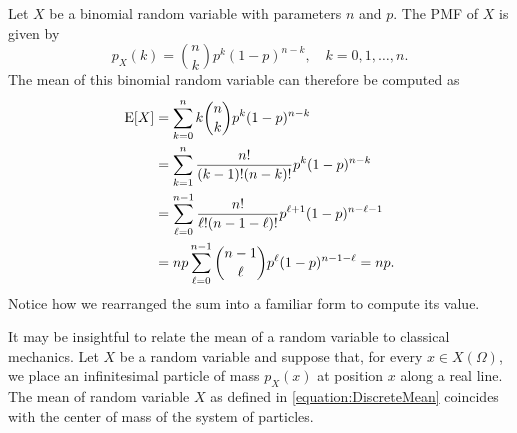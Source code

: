 \begin{example}
Let $X$ be a binomial random variable with parameters $n$ and $p$.
The PMF of $X$ is given by
\begin{equation*}
p_X (k) = \binom{n}{k} p^k (1-p)^{n-k}, \quad k = 0, 1, \ldots, n.
\end{equation*}
The mean of this binomial random variable can therefore be computed as
\begin{equation*}
\begin{split}
\mathrm{E} [X] &= \sum_{k=0}^n k \binom{n}{k} p^k (1-p)^{n-k} \\
&= \sum_{k=1}^n \frac{n!}{(k-1)!(n-k)!} p^k (1-p)^{n-k} \\
&= \sum_{\ell=0}^{n-1} \frac{n!}{\ell!(n-1-\ell)!} p^{\ell+1} (1-p)^{n-\ell-1} \\
&= n p \sum_{\ell=0}^{n-1} \binom{n-1}{\ell} p^{\ell} (1-p)^{n-1-\ell}
= n p .
\end{split}
\end{equation*}
Notice how we rearranged the sum into a familiar form to compute its value.
\end{example}

It may be insightful to relate the mean of a random variable to classical mechanics.
Let $X$ be a random variable and suppose that, for every $x \in X(\Omega)$, we place an infinitesimal particle of mass $p_X(x)$ at position $x$ along a real line.
The mean of random variable $X$ as defined in \eqref{equation:DiscreteMean} coincides with the center of mass of the system of particles.

